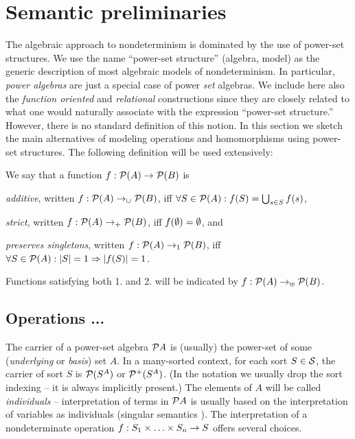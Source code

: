 
\section{Semantic preliminaries}\label{se:two}
The algebraic approach to 
nondeterminism is dominated by the use of power-set structures. We 
use the name ``power-set structure'' 
 (algebra, model) as the generic description of most algebraic models 
of nondeterminism. In particular, {\em power algebras} are just a 
special case of power {\em set} algebras. We include here also the {\em 
function oriented} and {\em relational}
 constructions since they are closely related to what one would 
naturally associate with the expression ``power-set 
structure.'' However, there is no standard definition of this notion. 
In this section we sketch the main alternatives of modeling operations and 
homomorphisms using power-set structures. The following definition 
will be used extensively:
\begin{Definition}  
We say that a function $f:{\cal P}(A)\mathrel{\rightarrow}{\cal P}(B)$ is  
\begin{enum}
\item {\em additive}, written $f:{\cal P}(A)\mathrel{\rightarrow_{\cup}}{\cal P}(B)$,   iff   
$\forall S\in{\cal P}(A) : f(S)=\bigcup_{s\in S}f(s)$,
\item {\em strict}, written $f:{\cal P}(A)\mathrel{\rightarrow_{+}}{\cal P}(B)$, iff 
$f(\emptyset)=\emptyset$, and
\item {\em preserves singletons}, written 
$f:{\cal P}(A)\mathrel{\rightarrow_{1}}{\cal P}(B)$, iff $\forall S\in{\cal P}(A):|S|=1\mathrel{\Rightarrow}|f(S)|=1$.
\end{enum}
Functions satisfying both 1. and 2. will be indicated by 
$f:{\cal P}(A)\mathrel{\rightarrow_{\uplus}}{\cal P}(B)$.
\end{Definition}

\subsection{Operations ...} 
The carrier of a power-set algebra ${\cal P} A$ is (usually) the
power-set of some ({\em underlying} or {\em basis}) set $A$. In a
many-sorted context, for each sort $S\in{\cal S}$, the carrier of sort
$S$ is ${\cal P}(S^{A})$ or ${\cal P}^{+}(S^{A})$. (In the notation we usually drop the sort
indexing -- it is always implicitly present.) The elements of $A$ will
be called {\em individuals} -- interpretation of terms in ${\cal P} A$ is
usually based on the interpretation of variables as individuals
(singular semantics \cite{c:110}). The interpretation of a nondeterminate
operation $f:S_{1}\times\ldots\times S_n\mathrel{\rightarrow} S$ offers several choices.


